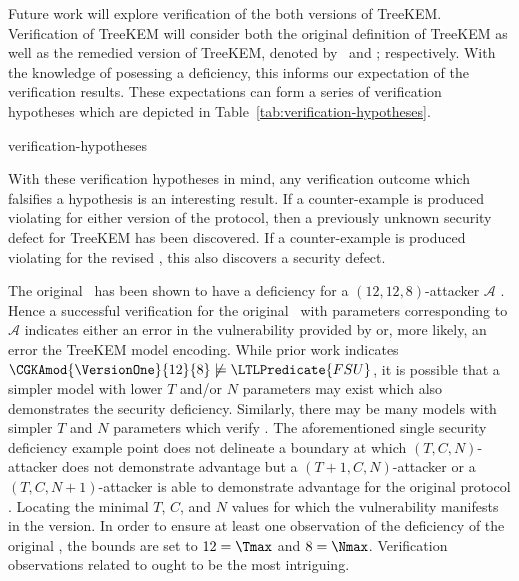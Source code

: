 Future work will explore verification of the both versions of TreeKEM.\@
Verification of TreeKEM will consider both the original definition of TreeKEM as well as the remedied version of TreeKEM, denoted by \VersionOne\ and \VersionTwo; respectively.
With the knowledge of \VersionOne posessing a  deficiency, this informs our expectation of the verification results.
These expectations can form a series of verification hypotheses which are depicted in Table\ \ref{tab:verification-hypotheses}.

\begin{table}[ht!]                                                                                                                      
\caption{%
\label{tab:verification-hypotheses}%
Verification Hypotheses of .
}%
{verification-hypotheses}
\end{table}

With these verification hypotheses in mind, any verification outcome which falsifies a hypothesis is an interesting result.
If a counter-example is produced violating  for either version of the protocol, then a previously unknown security defect for TreeKEM has been discovered.
If a counter-example is produced violating  for the revised \VersionTwo, this also discovers a security defect.

The original \VersionOne\ has been shown to have a  deficiency for a \((12, 12, 8)\)-attacker \(\mathcal{A}\) \autocite{alwen2020security}.
Hence a successful  verification for the original \VersionOne\ with parameters corresponding to \(\mathcal{A}\) indicates either an error in the vulnerability provided by \autocite{alwen2020security} or, more likely, an error the TreeKEM model encoding.
While prior work \autocite{alwen2020security} indicates \( \CGKAmod{\VersionOne}{12}{8} \not \models \LTLPredicate{FSU} \), it is possible that a simpler model with lower \(T\) and/or \(N\) parameters may exist which also demonstrates the  security deficiency.
Similarly, there may be many  models with simpler \(T\) and \(N\) parameters which verify .
The aforementioned single  security deficiency example point does not delineate a boundary at which \((T, C, N)\)-attacker does not demonstrate advantage but a \((T+1, C, N)\)-attacker or a \((T, C, N+1)\)-attacker is able to demonstrate advantage for the original protocol \VersionOne.
Locating the minimal \(T\), \(C\), and \(N\) values for which the vulnerability manifests in the \VersionOne version.
In order to ensure at least one observation of the  deficiency of the original \VersionOne, the bounds are set to \(12 = \Tmax\) and \(8 = \Nmax\).
Verification observations related to  ought to be the most intriguing.

